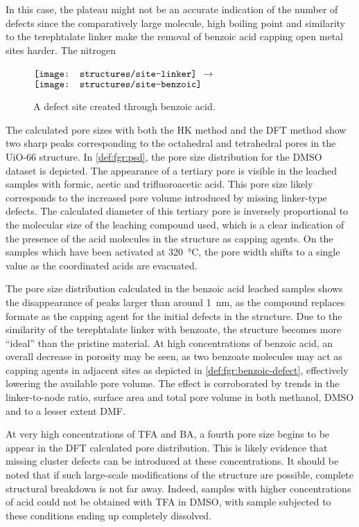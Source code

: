 In this case, the plateau might not be an accurate indication of
the number of defects since the comparatively large molecule,
high boiling point and similarity to the terephtalate linker
make the removal of benzoic acid capping open metal sites harder. 
The nitrogen 

\begin{figure}[!htb]
    \centering
    \( \vcenter{\hbox{\texttt{[image: structures/site-linker]}}}\)%
    \( \longrightarrow \)%
    \(\vcenter{\hbox{\texttt{[image: structures/site-benzoic]}}}\)
    \caption{A defect site created through benzoic acid.}%
    \label{def:fgr:benzoic-defect}
\end{figure}

The calculated pore sizes with both the HK method and the DFT method 
show two sharp peaks corresponding to the octahedral and tetrahedral
pores in the UiO-66 structure. In \autoref{def:fgr:psd}, the pore
size distribution for the DMSO dataset is depicted. The appearance of 
a tertiary pore is visible in the leached samples with formic,
acetic and trifluoroacetic acid. This pore size likely corresponds
to the increased pore volume introduced by missing linker-type 
defects. The calculated diameter of this tertiary pore is
inversely proportional to the molecular size of the 
leaching compound used, which is a clear indication of the presence of 
the acid molecules in the structure as capping agents. On the samples
which have been activated at \SI{320}{\degreeCelsius}, the pore width
shifts to a single value as the coordinated acids are evacuated.

The pore size distribution calculated in the benzoic acid leached
samples shows the disappearance of peaks larger than around 
\SI{1}{\nano\metre}, as the compound replaces formate as the 
capping agent for the initial defects in the structure. Due to the 
similarity of the terephtalate linker with benzoate, the structure
becomes more ``ideal'' than the pristine material. At high concentrations
of benzoic acid, an overall decrease in porosity may be seen, as 
two benzoate molecules may act as capping agents in adjacent 
sites as depicted in \autoref{def:fgr:benzoic-defect}, effectively 
lowering the available pore volume. The effect is corroborated 
by trends in the linker-to-node ratio, surface area and total 
pore volume in both methanol, DMSO and to a lesser extent DMF. 

At very high concentrations of TFA and BA, a fourth pore size
begins to be appear in the DFT calculated pore distribution.
This is likely evidence that missing cluster defects can be 
introduced at these concentrations. It should be noted that 
if such large-scale modifications of the structure are possible,
complete structural breakdown is not far away. Indeed, samples with 
higher concentrations of acid could not be obtained with TFA in DMSO,
with sample subjected to these conditions ending up completely
dissolved.


